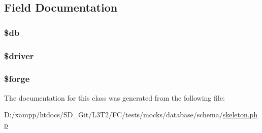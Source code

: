 \subsection{Field Documentation}
\hypertarget{class_mock___database___schema___skeleton_a1fa3127fc82f96b1436d871ef02be319}{}
\subsubsection[{\$db}]{\setlength{\rightskip}{0pt plus 5cm}\$db\hspace{0.3cm}{\ttfamily [static]}}\label{class_mock___database___schema___skeleton_a1fa3127fc82f96b1436d871ef02be319}
\hypertarget{class_mock___database___schema___skeleton_a142c9a24d4f80b32faeb93ca6e77f5e3}{}
\subsubsection[{\$driver}]{\setlength{\rightskip}{0pt plus 5cm}\$driver\hspace{0.3cm}{\ttfamily [static]}}\label{class_mock___database___schema___skeleton_a142c9a24d4f80b32faeb93ca6e77f5e3}
\hypertarget{class_mock___database___schema___skeleton_ae30bcdf49d65b81f7ce12940f2f14485}{}
\subsubsection[{\$forge}]{\setlength{\rightskip}{0pt plus 5cm}\$forge\hspace{0.3cm}{\ttfamily [static]}}\label{class_mock___database___schema___skeleton_ae30bcdf49d65b81f7ce12940f2f14485}


The documentation for this class was generated from the following file\+:\begin{DoxyCompactItemize}
\item 
D\+:/xampp/htdocs/\+S\+D\+\_\+\+Git/\+L3\+T2/\+F\+C/tests/mocks/database/schema/\hyperlink{skeleton_8php}{skeleton.\+php}\end{DoxyCompactItemize}
